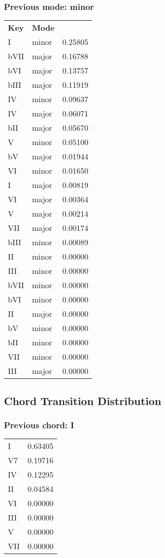 \subsubsection*{Previous mode: minor}

\begin{tabular}{l l l}
\textbf{Key} & \textbf{Mode} \\
I & minor & 0.25805 \\
bVII & major & 0.16788 \\
bVI & major & 0.13757 \\
bIII & major & 0.11919 \\
IV & minor & 0.09637 \\
IV & major & 0.06071 \\
bII & major & 0.05670 \\
V & minor & 0.05100 \\
bV & major & 0.01944 \\
VI & minor & 0.01650 \\
I & major & 0.00819 \\
VI & major & 0.00364 \\
V & major & 0.00214 \\
VII & major & 0.00174 \\
bIII & minor & 0.00089 \\
II & minor & 0.00000 \\
III & minor & 0.00000 \\
bVII & minor & 0.00000 \\
bVI & minor & 0.00000 \\
II & major & 0.00000 \\
bV & minor & 0.00000 \\
bII & minor & 0.00000 \\
VII & minor & 0.00000 \\
III & major & 0.00000 \\
\end{tabular}

\subsection{Chord Transition Distribution}


\subsubsection*{Previous chord: I}


\begin{tabular}{l l}
I & 0.63405 \\
V7 & 0.19716 \\
IV & 0.12295 \\
II & 0.04584 \\
VI & 0.00000 \\
III & 0.00000 \\
V & 0.00000 \\
VII & 0.00000 \\
\end{tabular}


